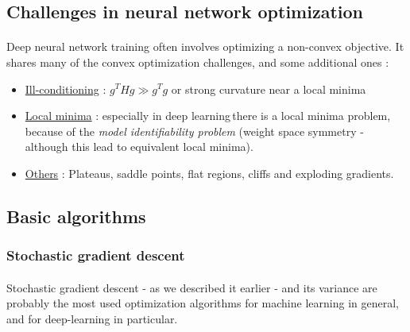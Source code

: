 \documentclass[a4paper]{article}
\newcommand\dl{deep learning\,}
\begin{document}
{{			
		}
		\subsection{Challenges in neural network optimization}
		{
			\paragraph{} Deep neural network training often involves optimizing a non-convex objective. It shares many of the convex optimization challenges, and some additional ones : 
			\begin{itemize}
				\item \underline{Ill-conditioning} : $g^THg  \gg g^Tg$ or strong curvature near a local minima 
				\item \underline{Local minima} : especially in \dl there is a local minima problem, because of the \emph{model identifiability problem} (weight space symmetry - although this lead to equivalent local minima). 
				\item \underline{Others} : Plateaus, saddle points, flat regions, cliffs and exploding gradients. 
			\end{itemize}
		}
		\subsection{Basic algorithms}
		{
			\subsubsection{Stochastic gradient descent}
			{
				\paragraph{} Stochastic gradient descent - as we described it earlier - and its variance are probably the most used optimization algorithms for machine learning in general, and for deep-learning in particular. 
				
				
}}}
\end{document}
